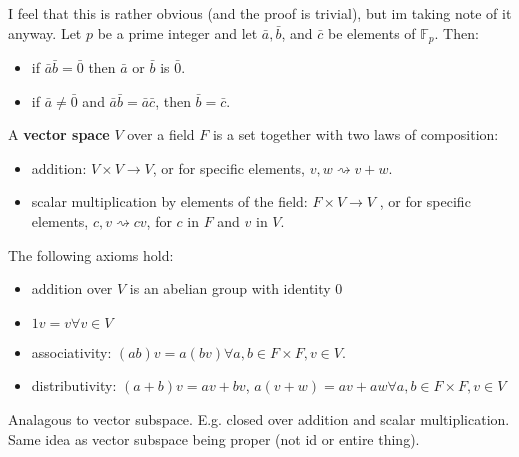 \begin{definition}

  I feel that this is rather obvious (and the proof is trivial), but im taking
  note of it anyway. Let $p$ be a prime integer and let $\bar{a},\bar{b}$, and
  $\bar{c}$ be elements of $\mathbb{F}_{p}$. Then:
  \begin{itemize}
      \item if $\bar{a}\bar{b}=\bar{0}$ then $\bar{a}$ or $\bar{b}$ is $\bar{0}$.
      \item if $\bar{a}\neq \bar{0}$ and $\bar{a}\bar{b}=\bar{a}\bar{c}$, then
      $\bar{b} = \bar{c}$.
  \end{itemize}

\end{definition}

\begin{definition}
  A \textbf{vector space} $V$ over a field $F$ is a set together with two laws
  of composition:
  \begin{itemize}
    \item addition: $V \times V \rightarrow V$, or for specific elements,
      $v, w \rightsquigarrow v + w$.
    \item scalar multiplication by elements of the field: $F \times V \rightarrow V$
      , or for specific elements, $c, v \rightsquigarrow cv$, for $c$ in $F$ and
      $v$ in $V$.
  \end{itemize}

  The following axioms hold:
  \begin{itemize}
    \item addition over $V$ is an abelian group with identity $0$
    \item $1v = v \forall v \in V$
    \item associativity: $(ab)v = a(bv)\forall a, b \in F \times F, v \in V$.
    \item distributivity:
      $(a+b)v = av + bv$, $a(v+w)=av + aw \forall a, b \in F \times F, v \in V$

  \end{itemize}

\end{definition}

\begin{definition}
  Analagous to vector subspace. E.g. closed over addition and scalar
  multiplication. Same idea as vector subspace being proper (not id or entire thing).
\end{definition}


